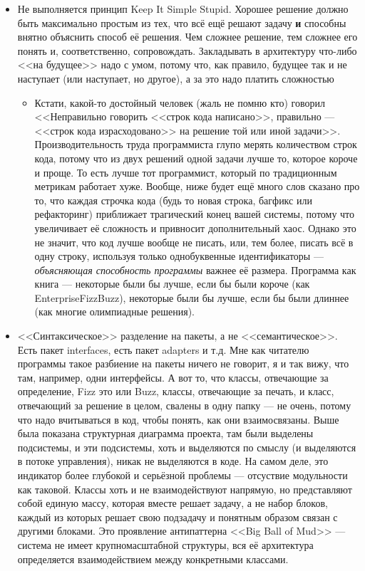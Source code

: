 \documentclass{../../text-style}
\begin{document}
\begin{itemize}
    \item Не выполняется принцип Keep It Simple Stupid. Хорошее решение должно быть максимально простым из тех, что всё ещё решают задачу \textbf{и} способны внятно объяснить способ её решения. Чем сложнее решение, тем сложнее его понять и, соответственно, сопровождать. Закладывать в архитектуру что-либо <<на будущее>> надо с умом, потому что, как правило, будущее так и не наступает (или наступает, но другое), а за это надо платить сложностью
    \begin{itemize}
        \item Кстати, какой-то достойный человек (жаль не помню кто) говорил <<Неправильно говорить <<строк кода написано>>, правильно --- <<строк кода израсходовано>> на решение той или иной задачи>>. Производительность труда программиста глупо мерять количеством строк кода, потому что из двух решений одной задачи лучше то, которое короче и проще. То есть лучше тот программист, который по традиционным метрикам работает хуже. Вообще, ниже будет ещё много слов сказано про то, что каждая строчка кода (будь то новая строка, багфикс или рефакторинг) приближает трагический конец вашей системы, потому что увеличивает её сложность и привносит дополнительный хаос. Однако это не значит, что код лучше вообще не писать, или, тем более, писать всё в одну строку, используя только однобуквенные идентификаторы --- \textit{объясняющая способность программы} важнее её размера. Программа как книга --- некоторые были бы лучше, если бы были короче (как EnterpriseFizzBuzz), некоторые были бы лучше, если бы были длиннее (как многие олимпиадные решения).
    \end{itemize}
    \item <<Синтаксическое>> разделение на пакеты, а не <<семантическое>>. Есть пакет interfaces, есть пакет adapters и т.д. Мне как читателю программы такое разбиение на пакеты ничего не говорит, я и так вижу, что там, например, одни интерфейсы. А вот то, что классы, отвечающие за определение, Fizz это или Buzz, классы, отвечающие за печать, и класс, отвечающий за решение в целом, свалены в одну папку --- не очень, потому что надо вчитываться в код, чтобы понять, как они взаимосвязаны. Выше была показана структурная диаграмма проекта, там были выделены подсистемы, и эти подсистемы, хоть и выделяются по смыслу (и выделяются в потоке управления), никак не выделяются в коде. На самом деле, это индикатор более глубокой и серьёзной проблемы --- отсуствие модульности как таковой. Классы хоть и не взаимодействуют напрямую, но представляют собой единую массу, которая вместе решает задачу, а не набор блоков, каждый из которых решает свою подзадачу и понятным образом связан с другими блоками. Это проявление антипаттерна <<Big Ball of Mud>> --- система не имеет крупномасштабной структуры, вся её архитектура определяется взаимодействием между конкретными классами.

\end{itemize}
\end{document}
